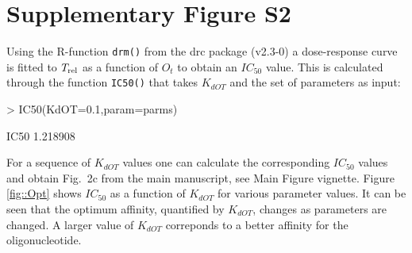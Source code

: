 \documentclass[a4paper,11pt]{article}
\newcommand{\Trel}{T_{\rm{rel}}}
\begin{document}
\section{Supplementary Figure S2}
Using the R-function \texttt{drm()} from the drc package (v2.3-0) a dose-response curve is fitted to $\Trel$ as a function of $O_t$ to obtain an $IC_{50}$ value. This is calculated through the function \texttt{IC50()} that takes $K_{dOT}$ and the set of parameters as input:
\begin{Schunk}
\begin{Sinput}
> IC50(KdOT=0.1,param=parms)
\end{Sinput}
\begin{Soutput}
    IC50 
1.218908 
\end{Soutput}
\end{Schunk}
 For a sequence of $K_{dOT}$ values one can calculate the corresponding $IC_{50}$ values and obtain Fig.~2c from the main manuscript, see Main Figure vignette. Figure \ref{fig::Opt} shows $IC_{50}$ as a function of $K_{dOT}$ for various parameter values. It can be seen that the optimum affinity, quantified by $K_{dOT}$, changes as parameters are changed. A larger value of $K_{dOT}$ correponds to a better affinity for the oligonucleotide.
%  
% 
%  
% 
\end{document}
